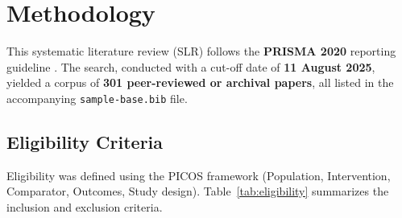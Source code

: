 \documentclass[acmsmall,anonymous]{acmart}
\begin{document}
\section{Methodology}
\label{sec:methodology}

This systematic literature review (SLR) follows the
\textbf{PRISMA 2020} reporting guideline \cite{page2021prisma}.
The search, conducted with a cut-off date of \textbf{11 August 2025}, yielded a corpus of
\textbf{301 peer-reviewed or archival papers}, all listed in the accompanying \verb|sample-base.bib| file.


\subsection{Eligibility Criteria}
Eligibility was defined using the \textsc{PICOS} framework (Population, Intervention, Comparator, Outcomes, Study design).
Table~\ref{tab:eligibility} summarizes the inclusion and exclusion criteria.
\end{document}
